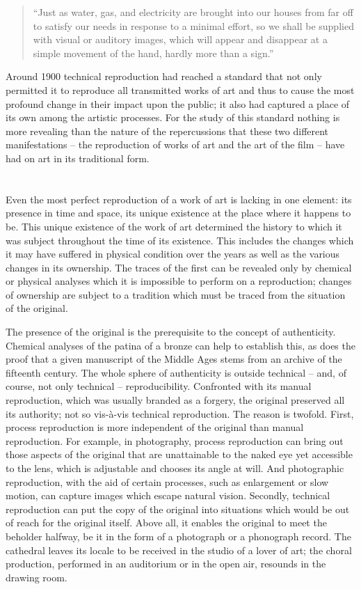\documentclass{article}
\begin{document}
 \begin{quote}
``Just as water, gas, and electricity are brought into our houses from far off
to satisfy our needs in response to a minimal effort, so we shall be supplied
with visual or auditory images, which will appear and disappear at a simple
movement of the hand, hardly more than a sign.''
\end{quote}

Around 1900 technical reproduction had reached a standard that not only
permitted it to reproduce all transmitted works of art and thus to cause the
most profound change in their impact upon the public; it also had captured a
place of its own among the artistic processes. For the study of this standard
nothing is more revealing than the nature of the repercussions that these two
different manifestations – the reproduction of works of art and the art of the
film – have had on art in its traditional form.

\section*{}
 Even the most perfect reproduction of a work of art is lacking in one element:
 its presence in time and space, its unique existence at the place where it
 happens to be. This unique existence of the work of art determined the history
 to which it was subject throughout the time of its existence. This includes
 the changes which it may have suffered in physical condition over the years as
 well as the various changes in its ownership. The traces of the first can be
 revealed only by chemical or physical analyses which it is impossible to
 perform on a reproduction; changes of ownership are subject to a tradition
 which must be traced from the situation of the original.

The presence of the original is the prerequisite to the concept of
authenticity. Chemical analyses of the patina of a bronze can help to establish
this, as does the proof that a given manuscript of the Middle Ages stems from
an archive of the fifteenth century. The whole sphere of authenticity is
outside technical – and, of course, not only technical – reproducibility.
Confronted with its manual reproduction, which was usually branded as a
forgery, the original preserved all its authority; not so vis-à-vis technical
reproduction. The reason is twofold. First, process reproduction is more
independent of the original than manual reproduction. For example, in
photography, process reproduction can bring out those aspects of the original
that are unattainable to the naked eye yet accessible to the lens, which is
adjustable and chooses its angle at will. And photographic reproduction, with
the aid of certain processes, such as enlargement or slow motion, can capture
images which escape natural vision. Secondly, technical reproduction can put
the copy of the original into situations which would be out of reach for the
original itself. Above all, it enables the original to meet the beholder
halfway, be it in the form of a photograph or a phonograph record. The
cathedral leaves its locale to be received in the studio of a lover of art; the
choral production, performed in an auditorium or in the open air, resounds in
the drawing room.
\end{document}
